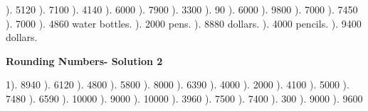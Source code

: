 \documentclass{article}%
\begin{document}
). 5120%
). 7100%
). 4140%
). 6000%
). 7900%
). 3300%
). 90%
). 6000%
). 9800%
). 7000%
). 7450%
). 7000%
). 4860 water bottles.%
). 2000 pens.%
). 8880 dollars.%
). 4000 pencils.%
). 9400 dollars.%
\newline%
\newpage%
\large%
\begin{center}%
\textbf{Rounding Numbers- Solution 2}%
\newline%
\end{center} \normalsize%
1). 8940%
). 6120%
). 4800%
). 5800%
). 8000%
). 6390%
). 4000%
). 2000%
). 4100%
). 5000%
). 7480%
). 6590%
). 10000%
). 9000%
). 10000%
). 3960%
). 7500%
). 7400%
). 300%
). 9000%
). 9600%
\newline%
\end{document}
